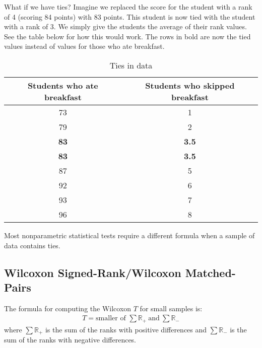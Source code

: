 What if we have ties? Imagine we replaced the score for the student with a rank of 4 (scoring 84 points) with 83 points. This student is now tied with the student with a rank of 3. We simply give the students the average of their rank values. See the table below for how this would work. The rows in bold are now the tied values instead of values for those who ate breakfast.
\begin{table}[h]
    \centering %
    \begin{tabular}{|c|c|} %
        \hline %
        Students who ate breakfast & Students who skipped breakfast \\ %
        \hline
        73 & 1 \\
        \hline
        79 & 2 \\ 
        \hline
        \textbf{83} & \textbf{3.5} \\
        \hline
        \textbf{83} & \textbf{3.5} \\
        \hline
        87 & 5 \\
        \hline
        92 & 6 \\
        \hline
        93 & 7 \\
        \hline
        96 & 8 \\
        \hline
    \end{tabular}
    \caption{Ties in data} %
    \label{tab:tied_breakfast} %
\end{table}
Most nonparametric statistical tests require a different formula when a sample of data contains ties.

\subsection{Wilcoxon Signed-Rank/Wilcoxon Matched-Pairs}

The formula for computing the Wilcoxon $T$ for small samples is:
\begin{align}
    T = \text{smaller of } \sum\mathds{R}_{+}\ \text{and}\ \sum\mathds{R}_{-}
\end{align}
where $\sum\mathds{R}_{+}$ is the sum of the ranks with positive differences and $\sum\mathds{R}_{-}$ is the sum of the ranks with negative differences.

